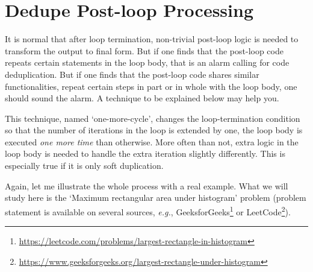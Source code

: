 \section{Dedupe Post-loop Processing}\label{sec:one-more-cycle}

It is normal that after loop termination, non-trivial post-loop logic is needed to
transform the output to final form.
But if one finds that the post-loop code repeats certain statements in the loop body,
that is an alarm calling for code deduplication.
But if one finds that the post-loop code shares similar functionalities,
repeat certain steps in part or in whole with the loop body, one should sound the alarm.
A technique to be explained below may help you.


This technique, named `one-more-cycle', changes the loop-termination condition so that
the number of iterations in the loop is extended by one, the loop body is executed \emph{one more time}
than otherwise.
More often than not, extra logic in the loop body is needed to handle the extra iteration
slightly differently.
This is especially true if it is only soft duplication.


Again, let me illustrate the whole process with a real example.
What we will study here is the `Maximum rectangular area under
histogram' problem (problem statement is available on several sources, \textit{e.g.},
GeeksforGeeks\footnote{\url{https://leetcode.com/problems/largest-rectangle-in-histogram}}
or LeetCode\footnote{\url{https://www.geeksforgeeks.org/largest-rectangle-under-histogram}}).

